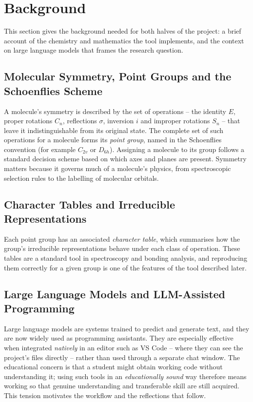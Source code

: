 \documentclass[11pt, a4paper]{article}
\begin{document}
\section{Background}
This section gives the background needed for both halves of the project: a brief
account of the chemistry and mathematics the tool implements, and the context on
large language models that frames the research question.

\subsection{Molecular Symmetry, Point Groups and the Schoenflies Scheme}
A molecule's symmetry is described by the set of operations -- the identity $E$,
proper rotations $C_n$, reflections $\sigma$, inversion $i$ and improper rotations
$S_n$ -- that leave it indistinguishable from its original state. The complete set of
such operations for a molecule forms its \emph{point group}, named in the Schoenflies
convention (for example $C_{2v}$ or $D_{6h}$). Assigning a molecule to its group
follows a standard decision scheme based on which axes and planes are present.
Symmetry matters because it governs much of a molecule's physics, from spectroscopic
selection rules to the labelling of molecular orbitals.

\subsection{Character Tables and Irreducible Representations}
Each point group has an associated \emph{character table}, which summarises how the
group's irreducible representations behave under each class of operation. These tables
are a standard tool in spectroscopy and bonding analysis, and reproducing them
correctly for a given group is one of the features of the tool described later.

\subsection{Large Language Models and LLM-Assisted Programming}
Large language models are systems trained to predict and generate text, and they are
now widely used as programming assistants. They are especially effective when
integrated \emph{natively} in an editor such as VS Code -- where they can see the
project's files directly -- rather than used through a separate chat window. The
educational concern is that a student might obtain working code without understanding
it; using such tools in an \emph{educationally sound} way therefore means working so
that genuine understanding and transferable skill are still acquired. This tension
motivates the workflow and the reflections that follow.
\end{document}
